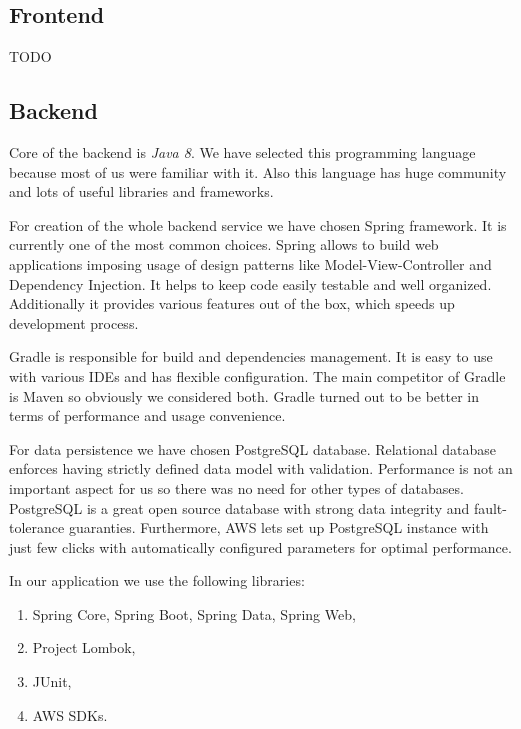 \documentclass[licencjacka,en]{thesisclass}
\begin{document}
    \subsection{Frontend}

    TODO

    \subsection{Backend}

    Core of the backend is \textit{Java 8}.
    We have selected this programming language because most of us were familiar with it.
    Also this language has huge community and lots of useful libraries and frameworks.

    For creation of the whole backend service we have chosen Spring \cite{Spring} framework.
    It is currently one of the most common choices.
    Spring allows to build web applications imposing usage of design patterns like Model-View-Controller and Dependency Injection.
    It helps to keep code easily testable and well organized.
    Additionally it provides various features out of the box, which speeds up development process.

    Gradle \cite{Gradle} is responsible for build and dependencies management.
    It is easy to use with various IDEs and has flexible configuration.
    The main competitor of Gradle is Maven so obviously we considered both.
    Gradle turned out to be better in terms of performance and usage convenience.

    For data persistence we have chosen PostgreSQL database.
    Relational database enforces having strictly defined data model with validation.
    Performance is not an important aspect for us so there was no need for other types of databases.
    PostgreSQL is a great open source database with strong data integrity and fault-tolerance guaranties.
    Furthermore, AWS lets set up PostgreSQL instance with just few clicks with automatically configured parameters for optimal performance.

    In our application we use the following libraries:
    \begin{enumerate}
        \item Spring Core, Spring Boot, Spring Data, Spring Web,
        \item Project Lombok,
        \item JUnit,
        \item AWS SDKs.
    \end{enumerate}
\end{document}
